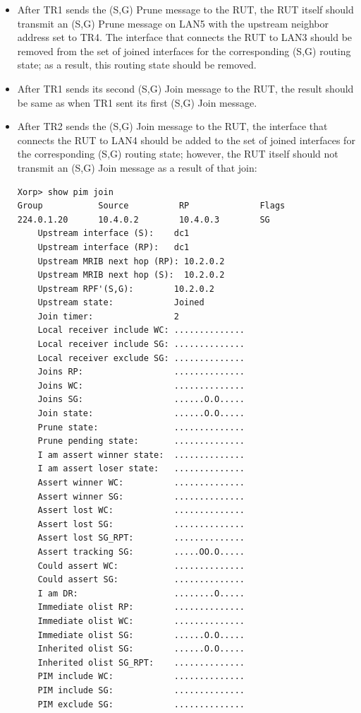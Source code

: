 \documentclass[11pt]{report}
\begin{document}
\begin{itemize}
  \item After TR1 sends the (S,G) Prune message to the RUT, the RUT itself
  should transmit an (S,G) Prune message on LAN5 with the upstream neighbor
  address set to TR4. The interface that connects the RUT to LAN3 should be
  removed from the set of joined interfaces for the corresponding (S,G)
  routing state; as a result, this routing state should be removed.

  \item After TR1 sends its second (S,G) Join message to the RUT, the
  result should be same as when TR1 sent its first (S,G) Join message.

  \item After TR2 sends the (S,G) Join message to the RUT, the interface
  that connects the RUT to LAN4 should be added to the set of joined
  interfaces for the corresponding (S,G) routing state; however, the RUT
  itself should not transmit an (S,G) Join message as a result of that
  join:

\begin{verbatim}
Xorp> show pim join 
Group           Source          RP              Flags
224.0.1.20      10.4.0.2        10.4.0.3        SG   
    Upstream interface (S):    dc1
    Upstream interface (RP):   dc1
    Upstream MRIB next hop (RP): 10.2.0.2
    Upstream MRIB next hop (S):  10.2.0.2
    Upstream RPF'(S,G):        10.2.0.2
    Upstream state:            Joined 
    Join timer:                2
    Local receiver include WC: ..............
    Local receiver include SG: ..............
    Local receiver exclude SG: ..............
    Joins RP:                  ..............
    Joins WC:                  ..............
    Joins SG:                  ......O.O.....
    Join state:                ......O.O.....
    Prune state:               ..............
    Prune pending state:       ..............
    I am assert winner state:  ..............
    I am assert loser state:   ..............
    Assert winner WC:          ..............
    Assert winner SG:          ..............
    Assert lost WC:            ..............
    Assert lost SG:            ..............
    Assert lost SG_RPT:        ..............
    Assert tracking SG:        .....OO.O.....
    Could assert WC:           ..............
    Could assert SG:           ..............
    I am DR:                   ........O.....
    Immediate olist RP:        ..............
    Immediate olist WC:        ..............
    Immediate olist SG:        ......O.O.....
    Inherited olist SG:        ......O.O.....
    Inherited olist SG_RPT:    ..............
    PIM include WC:            ..............
    PIM include SG:            ..............
    PIM exclude SG:            ..............
\end{verbatim}


\end{itemize}
\end{document}
